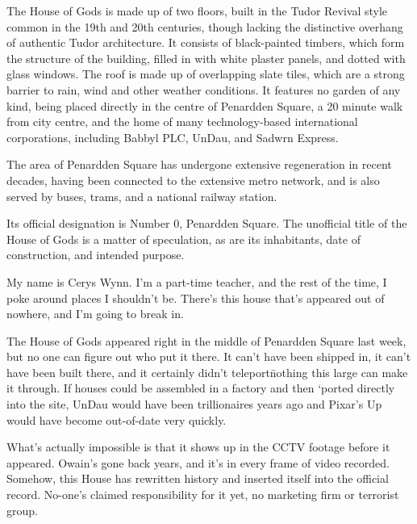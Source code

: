 

\prelude

The House of Gods is made up of two floors, built in the Tudor Revival
style common in the 19th and 20th centuries, though lacking the
distinctive overhang of authentic Tudor architecture. It consists of
black-painted timbers, which form the structure of the building,
filled in with white plaster panels, and dotted with glass
windows. The roof is made up of overlapping slate tiles, which are a
strong barrier to rain, wind and other weather conditions. It features
no garden of any kind, being placed directly in the centre of
Penardden Square, a 20 minute walk from city centre, and the home of
many technology-based international corporations, including Babbyl
PLC, UnDau, and Sadwrn Express.

The area of Penardden Square has undergone extensive regeneration in
recent decades, having been connected to the extensive metro network,
and is also served by buses, trams, and a national railway station.

Its official designation is Number 0, Penardden Square. The unofficial
title of the House of Gods is a matter of speculation, as are its
inhabitants, date of construction, and intended purpose.

\fugue


My name is Cerys Wynn. I’m a part-time teacher, and the rest of the
time, I poke around places I shouldn’t be. There’s this house that’s
appeared out of nowhere, and I’m going to break in.

The House of Gods appeared right in the middle of Penardden Square
last week, but no one can figure out who put it there. It can’t have
been shipped in, it can’t have been built there, and it certainly
didn’t teleport\=nothing this large can make it through. If houses
could be assembled in a factory and then ‘ported directly into the
site, UnDau would have been trillionaires years ago and Pixar’s Up
would have become out-of-date very quickly.

What’s actually impossible is that it shows up in the CCTV footage
before it appeared. Owain’s gone back years, and it’s in every frame
of video recorded. Somehow, this House has rewritten history and
inserted itself into the official record. No-one’s claimed
responsibility for it yet, no marketing firm or terrorist group.

